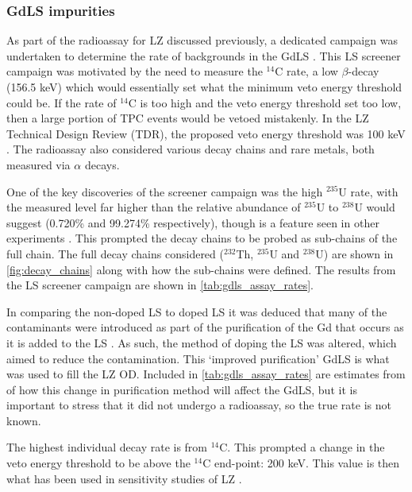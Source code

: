 \subsubsection{GdLS impurities}
\par
As part of the radioassay for LZ discussed previously, a dedicated campaign was undertaken to determine the rate of backgrounds in the GdLS \cite{scotthaselschwardt_thesis_ref}.
This LS screener campaign was motivated by the need to measure the $^{14}$C rate, a low $\beta$-decay (156.5 keV) which would essentially set what the minimum veto energy threshold could be.
If the rate of $^{14}$C is too high and the veto energy threshold set too low, then a large portion of TPC events would be vetoed mistakenly.
In the LZ Technical Design Review (TDR), the proposed veto energy threshold was 100 keV \cite{LZ_TechnicalDesignReview_ref}.
The radioassay also considered various decay chains and rare metals, both measured via $\alpha$ decays.
\par
One of the key discoveries of the screener campaign was the high ${}^{235}$U rate, with the measured level far higher than the relative abundance of ${}^{235}$U to ${}^{238}$U would suggest (0.720\% and 99.274\% respectively), though is a feature seen in other experiments \cite{javierperez_thesis_ref,superkamiokande_neutron_tagging_ref}.
This prompted the decay chains to be probed as sub-chains of the full chain.
The full decay chains considered ($^{232}$Th, $^{235}$U and $^{238}$U) are shown in \autoref{fig:decay_chains} along with how the sub-chains were defined.
The results from the LS screener campaign are shown in \autoref{tab:gdls_assay_rates}.
\par
In comparing the non-doped LS to doped LS it was deduced that many of the contaminants were introduced as part of the purification of the Gd that occurs as it is added to the LS \cite{scotthaselschwardt_thesis_ref}.
As such, the method of doping the LS was altered, which aimed to reduce the contamination.
This `improved purification' GdLS is what was used to fill the LZ OD.
Included in \autoref{tab:gdls_assay_rates} are estimates from \cite{scotthaselschwardt_thesis_ref} of how this change in purification method will affect the GdLS, but it is important to stress that it did not undergo a radioassay, so the true rate is not known.
\par
The highest individual decay rate is from ${}^{14}$C.
This prompted a change in the veto energy threshold to be above the ${}^{14}$C end-point: 200 keV.
This value is then what has been used in sensitivity studies of LZ \cite{LZ_projected_sensitivity_paper_ref}.

